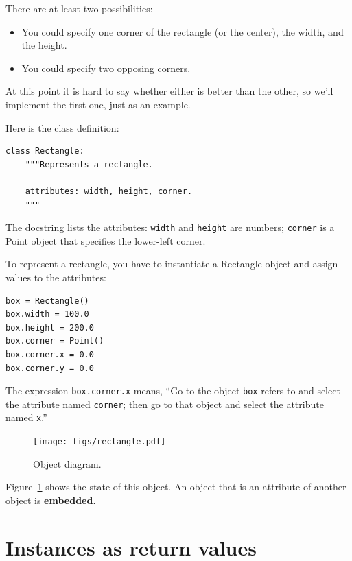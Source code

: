 \documentclass[10pt]{book}
\begin{document}
There are at least two possibilities: 

\begin{itemize}

\item You could specify one corner of the rectangle
(or the center), the width, and the height.

\item You could specify two opposing corners.

\end{itemize}

At this point it is hard to say whether either is better than
the other, so we'll implement the first one, just as an example.

Here is the class definition:

\begin{verbatim}
class Rectangle:
    """Represents a rectangle. 

    attributes: width, height, corner.
    """
\end{verbatim}
%
The docstring lists the attributes:  {\tt width} and
{\tt height} are numbers; {\tt corner} is a Point object that
specifies the lower-left corner.

To represent a rectangle, you have to instantiate a Rectangle
object and assign values to the attributes:

\begin{verbatim}
box = Rectangle()
box.width = 100.0
box.height = 200.0
box.corner = Point()
box.corner.x = 0.0
box.corner.y = 0.0
\end{verbatim}
%
The expression {\tt box.corner.x} means,
``Go to the object {\tt box} refers to and select the attribute named
{\tt corner}; then go to that object and select the attribute named
{\tt x}.''

\begin{figure}
\centerline
{\texttt{[image: figs/rectangle.pdf]}}
\caption{Object diagram.}
\label{fig.rectangle}
\end{figure}


Figure~\ref{fig.rectangle} shows the state of this object.
An object that is an attribute of another object is {\bf embedded}.


\section{Instances as return values}
\end{document}
